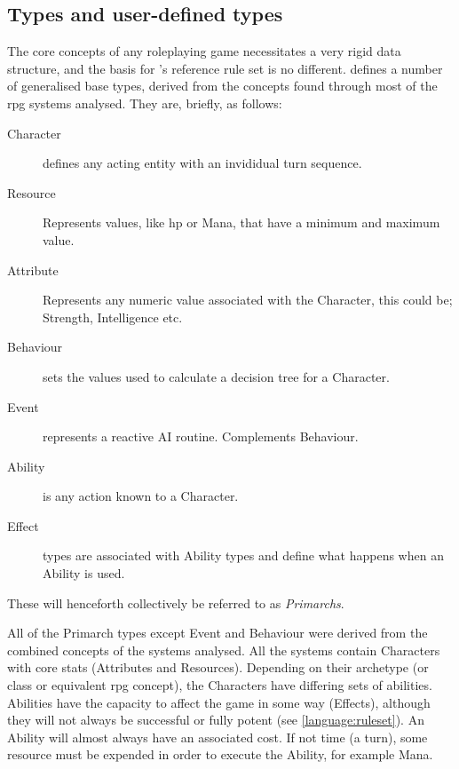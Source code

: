\subsection{Types and user-defined types}
\label{language:types}
The core concepts of any roleplaying game necessitates a very rigid data structure, and the basis for \langname{}'s reference rule set is no different.
\langname{} defines a number of generalised base types, derived from the concepts found through most of the \ac{rpg} systems analysed. They are, briefly, as follows:
\begin{description}
	\item[Character] defines any acting entity with an invididual turn sequence.
	\item[Resource] Represents values, like \ac{hp} or Mana, that have a minimum and maximum value.
	\item[Attribute] Represents any numeric value associated with the Character, this could be; Strength, Intelligence etc.
	\item[Behaviour] sets the values used to calculate a decision tree for a Character.
	\item[Event] represents a reactive AI routine. Complements Behaviour.
	\item[Ability] is any action known to a Character.
	\item[Effect] types are associated with Ability types and define what happens when an Ability is used.
\end{description} 
These will henceforth collectively be referred to as \emph{Primarchs}.

All of the Primarch types except Event and Behaviour were derived from the combined concepts of the systems analysed. All the systems contain Characters with core stats (Attributes and Resources). Depending on their archetype (or class or equivalent \ac{rpg} concept), the Characters have differing sets of abilities.
Abilities have the capacity to affect the game in some way (Effects), although they will not always be successful or fully potent (see \vref{language:ruleset}). An Ability will almost always have an associated cost. If not time (a turn), some resource must be expended in order to execute the Ability, for example Mana. %

